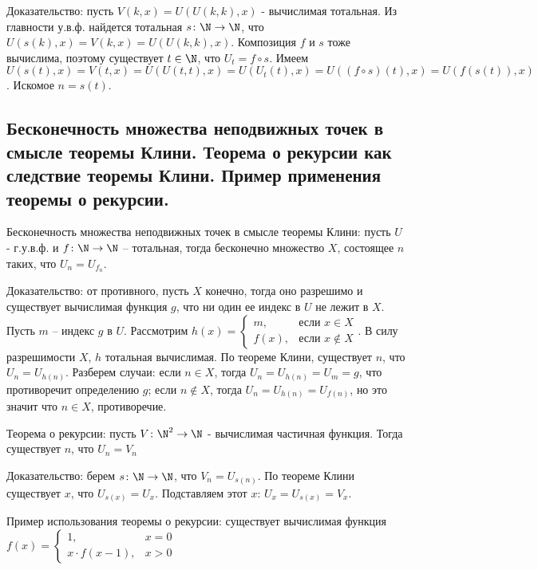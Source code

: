 \documentclass[a4paper, 10pt]{article}
\begin{document}
Доказательство: пусть $V(k,x)=U(U(k,k),x)$ - вычислимая тотальная. Из главности у.в.ф. найдется тотальная $s\colon\N\to\N$, что $U(s(k),x)=V(k,x)=U(U(k,k),x)$. Композиция $f$ и $s$ тоже вычислима, поэтому существует $t\in\N$, что $U_t=f\circ s$. Имеем $U(s(t),x)=V(t,x)=U(U(t,t),x)=U(U_t(t),x)=U((f\circ s)(t),x)=U(f(s(t)),x)$. Искомое $n=s(t)$.

\subsection{Бесконечность множества неподвижных точек в смысле теоремы Клини. Теорема о рекурсии как следствие теоремы Клини. Пример применения теоремы о рекурсии.}

Бесконечность множества неподвижных точек в смысле теоремы Клини: пусть $U$ - г.у.в.ф. и $f\colon\N\to\N$ -- тотальная, тогда бесконечно множество $X$, состоящее $n$ таких, что $U_n=U_{f_n}$.

Доказательство: от противного, пусть $X$ конечно, тогда оно разрешимо и существует вычислимая функция $g$, что ни один ее индекс в $U$ не лежит в $X$. Пусть $m$ -- индекс $g$ в $U$. Рассмотрим $h(x)=\begin{cases}
    m,&\text{если }x\in X \\ f(x),&\text{если }x\not\in X
\end{cases}$. В силу разрешимости $X$, $h$ тотальная вычислимая. По теореме Клини, существует $n$, что $U_n=U_{h(n)}$. Разберем случаи: если $n\in X$, тогда $U_n=U_{h(n)}=U_m=g$, что противоречит определению $g$; если $n\not\in X$, тогда $U_n=U_{h(n)}=U_{f(n)}$, но это значит что $n\in X$, противоречие.

\hfill

Теорема о рекурсии: пусть $V\colon\N^2\to\N$ - вычислимая частичная функция. Тогда существует $n$, что $U_n=V_n$

Доказательство: берем $s\colon\N\to\N$, что $V_n=U_{s(n)}$. По теореме Клини существует $x$, что $U_{s(x)}=U_x$. Подставляем этот $x$: $U_x=U_{s(x)}=V_x$.

\hfill

Пример использования теоремы о рекурсии: существует вычислимая функция $f(x)=\begin{cases}
    1,&x=0 \\ x\cdot f(x-1),&x>0
\end{cases}$
\end{document}
